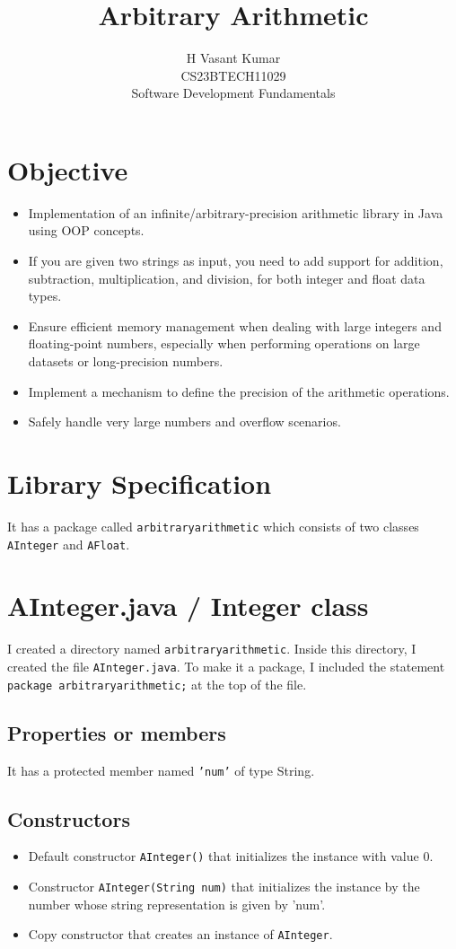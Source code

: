 \documentclass{article}
\title{\textbf{\LARGE Arbitrary Arithmetic}}
\author{\large H Vasant Kumar\\
        CS23BTECH11029\\
        Software Development Fundamentals}
\date{}
\begin{document}
\begin{center}
    \thetitle
\end{center}
\vspace{1em}
\begin{flushright}
    \theauthor
\end{flushright}
\section*{Objective}
\begin{itemize}
    \item Implementation of an infinite/arbitrary-precision arithmetic library in Java using OOP concepts.
    \item If you are given two strings as input, you need to add support for addition, subtraction, multiplication, and division, for both integer and float data types.
    \item Ensure efficient memory management when dealing with large integers and floating-point numbers, especially when performing operations on large datasets or long-precision numbers.
    \item  Implement a mechanism to define the precision of the arithmetic operations.
    \item Safely handle very large numbers and overflow scenarios.
\end{itemize}

\section*{Library Specification}
It has a package called \texttt{arbitraryarithmetic} which consists of two classes \texttt{AInteger} and \texttt{AFloat}.

\section*{AInteger.java / Integer class}
I created a directory named \texttt{arbitraryarithmetic}. Inside this directory, I created the file \texttt{AInteger.java}. To make it a package, I included the statement \texttt{package arbitraryarithmetic;} at the top of the file.

\subsection*{Properties or members}
It has a protected member named \texttt{'num'} of type String.

\subsection*{Constructors}
\begin{itemize}
    \item Default constructor \texttt{AInteger()} that initializes the instance with value 0.
    \item Constructor \texttt{AInteger(String num)} that initializes the instance by the number whose string representation is given by 'num'.
    \item Copy constructor that creates an instance of \texttt{AInteger}.
\end{itemize}
\end{document}
